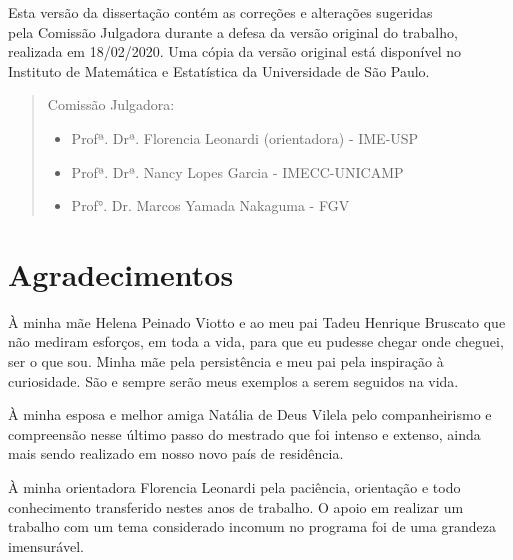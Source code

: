 \documentclass[12pt,twoside,a4paper]{book}
\begin{document}
\vskip 2cm

\begin{flushright}
    Esta versão da dissertação contém as correções e alterações sugeridas\\
    pela Comissão Julgadora durante a defesa da versão original do trabalho,\\
    realizada em 18/02/2020. Uma cópia da versão original está disponível no\\
    Instituto de Matemática e Estatística da Universidade de São Paulo.

\vskip 2cm

\end{flushright}
 
\vskip 4.2cm

\begin{quote}
\noindent Comissão Julgadora:

\begin{itemize}
    \item Profª. Drª. Florencia Leonardi (orientadora) - IME-USP
    \item Profª. Drª. Nancy Lopes Garcia - IMECC-UNICAMP
    \item Prof°. Dr. Marcos Yamada Nakaguma - FGV
\end{itemize}

\end{quote}

\vskip 4.2cm

\chapter*{Agradecimentos}

À minha mãe Helena Peinado Viotto e ao meu pai Tadeu Henrique Bruscato que não mediram esforços, em toda a vida, para que eu pudesse chegar onde cheguei, ser o que sou. Minha mãe pela persistência e meu pai pela inspiração à curiosidade. São e sempre serão meus exemplos a serem seguidos na vida.

À minha esposa e melhor amiga Natália de Deus Vilela pelo companheirismo e compreensão nesse último passo do mestrado que foi intenso e extenso, ainda mais sendo realizado em nosso novo país de residência.

À minha orientadora Florencia Leonardi pela paciência, orientação e todo conhecimento transferido nestes anos de trabalho. O apoio em realizar um trabalho com um tema considerado incomum no programa foi de uma grandeza imensurável.
\end{document}
